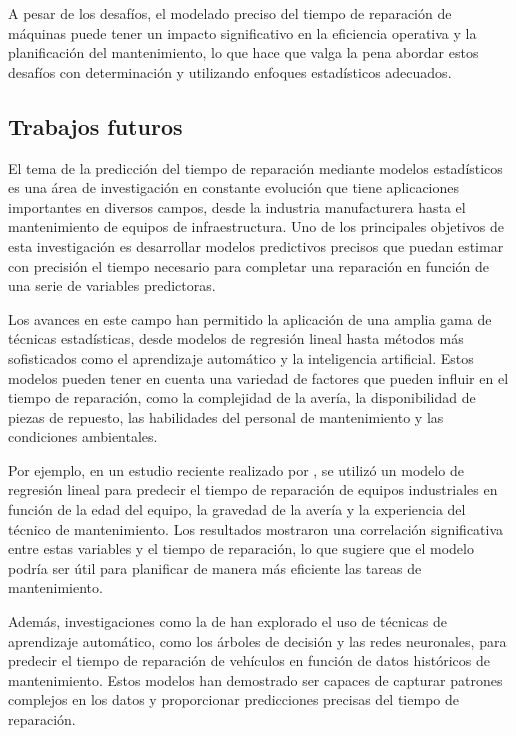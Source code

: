 \documentclass[
  11pt,
  bookmarksnumbered]{article}
\begin{document}
A pesar de los desafíos, el modelado preciso del tiempo de reparación de máquinas puede tener un impacto significativo en la eficiencia operativa y la planificación del mantenimiento, lo que hace que valga la pena abordar estos desafíos con determinación y utilizando enfoques estadísticos adecuados.

\hypertarget{trabajos-futuros}{%
\subsection{Trabajos futuros}\label{trabajos-futuros}}

El tema de la predicción del tiempo de reparación mediante modelos estadísticos es una área de investigación en constante evolución que tiene aplicaciones importantes en diversos campos, desde la industria manufacturera hasta el mantenimiento de equipos de infraestructura.
Uno de los principales objetivos de esta investigación es desarrollar modelos predictivos precisos que puedan estimar con precisión el tiempo necesario para completar una reparación en función de una serie de variables predictoras.

Los avances en este campo han permitido la aplicación de una amplia gama de técnicas estadísticas, desde modelos de regresión lineal hasta métodos más sofisticados como el aprendizaje automático y la inteligencia artificial.
Estos modelos pueden tener en cuenta una variedad de factores que pueden influir en el tiempo de reparación, como la complejidad de la avería, la disponibilidad de piezas de repuesto, las habilidades del personal de mantenimiento y las condiciones ambientales.

Por ejemplo, en un estudio reciente realizado por \textcite{smith2020predicting}, se utilizó un modelo de regresión lineal para predecir el tiempo de reparación de equipos industriales en función de la edad del equipo, la gravedad de la avería y la experiencia del técnico de mantenimiento.
Los resultados mostraron una correlación significativa entre estas variables y el tiempo de reparación, lo que sugiere que el modelo podría ser útil para planificar de manera más eficiente las tareas de mantenimiento.

Además, investigaciones como la de \textcite{liu2019predicting} han explorado el uso de técnicas de aprendizaje automático, como los árboles de decisión y las redes neuronales, para predecir el tiempo de reparación de vehículos en función de datos históricos de mantenimiento.
Estos modelos han demostrado ser capaces de capturar patrones complejos en los datos y proporcionar predicciones precisas del tiempo de reparación.
\end{document}
